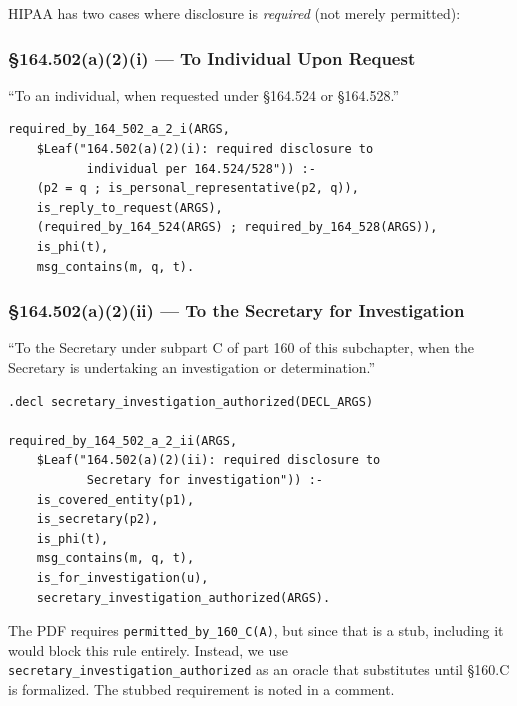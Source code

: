 \documentclass[11pt,letterpaper]{article}
\begin{document}
HIPAA has two cases where disclosure is \emph{required} (not merely permitted):

\subsubsection{\S 164.502(a)(2)(i) --- To Individual Upon Request}

\begin{hipaabox}
``To an individual, when requested under \S 164.524 or \S 164.528.''
\end{hipaabox}

\begin{lstlisting}[style=soufflestyle,caption={\S 164.502(a)(2)(i)}]
required_by_164_502_a_2_i(ARGS,
    $Leaf("164.502(a)(2)(i): required disclosure to
           individual per 164.524/528")) :-
    (p2 = q ; is_personal_representative(p2, q)),
    is_reply_to_request(ARGS),
    (required_by_164_524(ARGS) ; required_by_164_528(ARGS)),
    is_phi(t),
    msg_contains(m, q, t).
\end{lstlisting}

\subsubsection{\S 164.502(a)(2)(ii) --- To the Secretary for Investigation}

\begin{hipaabox}
``To the Secretary under subpart C of part 160 of this subchapter, when the Secretary is undertaking an investigation or determination.''
\end{hipaabox}

\begin{lstlisting}[style=soufflestyle,caption={\S 164.502(a)(2)(ii)}]
.decl secretary_investigation_authorized(DECL_ARGS)

required_by_164_502_a_2_ii(ARGS,
    $Leaf("164.502(a)(2)(ii): required disclosure to
           Secretary for investigation")) :-
    is_covered_entity(p1),
    is_secretary(p2),
    is_phi(t),
    msg_contains(m, q, t),
    is_for_investigation(u),
    secretary_investigation_authorized(ARGS).
\end{lstlisting}

\begin{designbox}
The PDF requires \texttt{permitted\_by\_160\_C(A)}, but since that is a stub, including it would block this rule entirely. Instead, we use \texttt{secretary\_investigation\_authorized} as an oracle that substitutes until \S 160.C is formalized. The stubbed requirement is noted in a comment.
\end{designbox}
\end{document}
